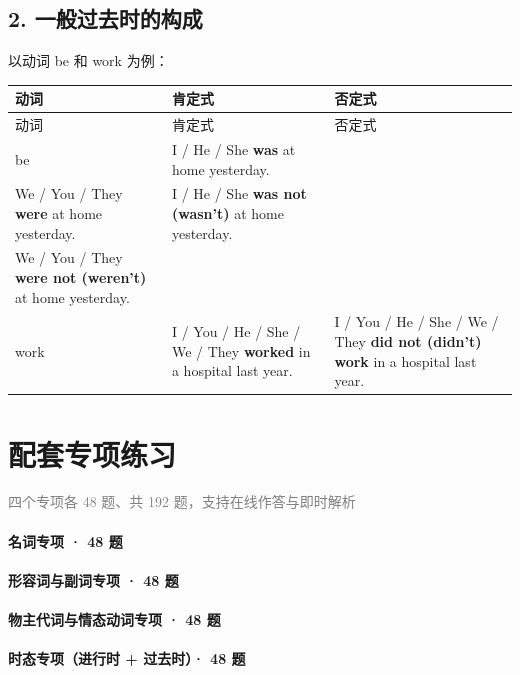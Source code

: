 \documentclass[11pt,a4paper]{ctexart}
\begin{document}
\subsection*{2. 一般过去时的构成}

以动词 be 和 work 为例：

{\footnotesize
\begin{longtable}{p{4.47cm}p{4.47cm}p{4.47cm}}
\hline
动词 & 肯定式 & 否定式 \\
\hline
\endfirsthead
\hline
动词 & 肯定式 & 否定式 \\
\hline
\endhead
\hline
\endfoot
be & I / He / She \textbf{was} at home yesterday.\\ We / You / They \textbf{were} at home yesterday. & I / He / She \textbf{was not (wasn’t)} at home yesterday.\\ We / You / They \textbf{were not (weren’t)} at home yesterday. \\
work & I / You / He / She / We / They \textbf{worked} in a hospital last year. & I / You / He / She / We / They \textbf{did not (didn’t) work} in a hospital last year. \\
\end{longtable}
}

\begin{center}\end{center}

\section{配套专项练习}
\noindent\textcolor{gray}{四个专项各 48 题、共 192 题，支持在线作答与即时解析}\par\smallskip
\paragraph{名词专项 · 48 题}

\paragraph{形容词与副词专项 · 48 题}

\paragraph{物主代词与情态动词专项 · 48 题}

\paragraph{时态专项（进行时 + 过去时）· 48 题}

\begin{center}\end{center}
\end{document}
